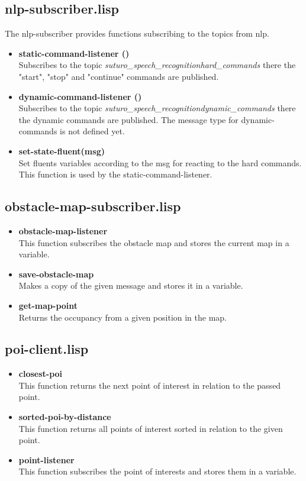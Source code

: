 \documentclass[main.tex]{subfiles}
\begin{document}
		\subsection{nlp-subscriber.lisp}
		The nlp-subscriber provides functions subscribing to the topics from nlp.
		\begin{itemize}
		   \item \textbf{static-command-listener ()} \\
		   Subscribes to the topic \textit{suturo\_speech\_recognition\/hard\_commands} there the "start", "stop" and "continue" commands are published.
		   \item \textbf{dynamic-command-listener ()} \\
		   Subscribes to the topic \textit{suturo\_speech\_recognition\/dynamic\_commands} there the dynamic commands are published. The message type for dynamic-commands is not defined yet.
		   \item \textbf{set-state-fluent(msg)} \\
		   Set fluents variables according to the msg for reacting to the hard commands. This function is used by the static-command-listener.
		 \end{itemize}
		\subsection{obstacle-map-subscriber.lisp}
	    \begin{itemize}
	    	\item \textbf{obstacle-map-listener} \\
	    	This function subscribes the obstacle map and stores the current map in a variable.
	    	\item \textbf{save-obstacle-map} \\
	    	Makes a copy of the given message and stores it in a variable.
	    	\item \textbf{get-map-point} \\
	    	Returns the occupancy from a given position in the map.
	    \end{itemize}
		\subsection{poi-client.lisp}
 		\begin{itemize}
	    	\item \textbf{closest-poi} \\
	    	This function returns the next point of interest in relation to the passed point.
	    	\item \textbf{sorted-poi-by-distance} \\
	    	This function returns all points of interest sorted in relation to the given point.
	    	\item \textbf{point-listener} \\
	    	This function subscribes the point of interests and stores them in a variable.
	    \end{itemize}
\end{document}

